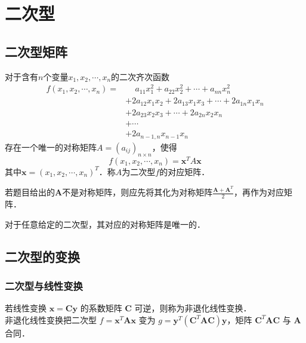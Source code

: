 \documentclass[12pt, a4paper, oneside, UTF8]{ctexbook}
\begin{document}
% 
\else
\fi
\chapter{二次型}

\section{二次型矩阵}

\begin{definition}[二次型]
    对于含有$n$个变量$x_1, x_2, \cdots, x_n$的二次齐次函数
    \begin{align*}
        f(x_1, x_2, \cdots, x_n) =& \quad\,a_{11} x_1^2 + a_{22} x_2^2 + \cdots + a_{nn} x_n^2 \\
        &+ 2 a_{12} x_1 x_2 + 2 a_{13} x_1 x_3 + \cdots + 2 a_{1n} x_1 x_n\\
        &+ 2 a_{23} x_2 x_3 + \cdots + 2 a_{2n} x_2 x_n \\
        &+ \cdots \\
        &+ 2 a_{n-1,n} x_{n-1} x_n
    \end{align*}
    存在一个唯一的对称矩阵$A = (a_{ij})_{n \times n}$，使得
    \[ f(x_1, x_2, \cdots, x_n) = \bm{x}^T A \bm{x} \]
    其中$\bm{x} = (x_1, x_2, \cdots, x_n)^T$．称$A$为二次型$f$的对应矩阵．
    \begin{myRemark}
        若题目给出的$\bm{A}$不是对称矩阵，则应先将其化为对称矩阵$\frac{\bm{A} + \bm{A}^T}{2}$，再作为对应矩阵．
    \end{myRemark}
\end{definition}

\begin{theorem}
    对于任意给定的二次型，其对应的对称矩阵是唯一的．
\end{theorem}

\section{二次型的变换}

\subsection{二次型与线性变换}

\begin{definition}[非退化线性变换]
    若线性变换 $\bm{x} = \bm{C}\bm{y}$ 的系数矩阵 $\bm{C}$ 可逆，则称为非退化线性变换．\\
    非退化线性变换把二次型 $f = \bm{x}^T \bm{A} \bm{x}$ 变为 $g = \bm{y}^T (\bm{C}^T \bm{A} \bm{C}) \bm{y}$，矩阵 $\bm{C}^T \bm{A} \bm{C}$ 与 $\bm{A}$ 合同．
\end{definition}
\end{document}
